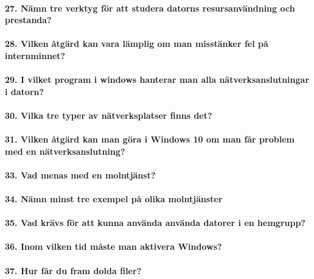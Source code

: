 \paragraph{27. Nämn tre verktyg för att studera datorns resursanvändning och prestanda?}

\paragraph{28. Vilken åtgärd kan vara lämplig om man misstänker fel på internminnet?}

\paragraph{29. I vilket program i windows hanterar man alla nätverksanslutningar i datorn?}

\paragraph{30. Vilka tre typer av nätverksplatser finns det?}

\paragraph{31. Vilken åtgärd kan man göra i Windows 10 om man får problem med en nätverksanslutning?}

\paragraph{33. Vad menas med en molntjänst?}

\paragraph{34. Nämn minst tre exempel på olika molntjänster}

\paragraph{35. Vad krävs för att kunna använda använda datorer i en hemgrupp?}

\paragraph{36. Inom vilken tid måste man aktivera Windows?}

\paragraph{37. Hur får du fram dolda filer?}

